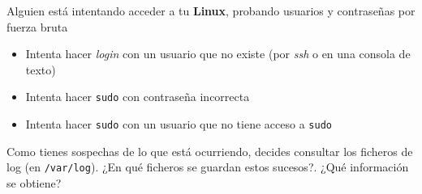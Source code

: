 \newpage
\begin{homeworkProblem}

  \begin{multicols}{2}

    \begin{Actividad}
      Alguien está intentando acceder a tu \textbf{Linux}, probando usuarios y contraseñas por fuerza bruta
      \begin{itemize}
      \item Intenta hacer \textit{login} con un usuario que no existe (por \textit{ssh} o en una consola de texto)
      \item Intenta hacer \texttt{sudo} con contraseña incorrecta
      \item Intenta hacer \texttt{sudo} con un usuario que no tiene acceso a \texttt{sudo}
      \end{itemize}
    \end{Actividad}
    \columnbreak

    \null \vfill

    \begin{Actividad}
      Como tienes sospechas de lo que está ocurriendo, decides consultar los ficheros de log (en \texttt{/var/log}). ¿En qué ficheros se guardan estos sucesos?. ¿Qué información se obtiene?
    \end{Actividad}

    \vfill \null

  \end{multicols}


\end{homeworkProblem}




